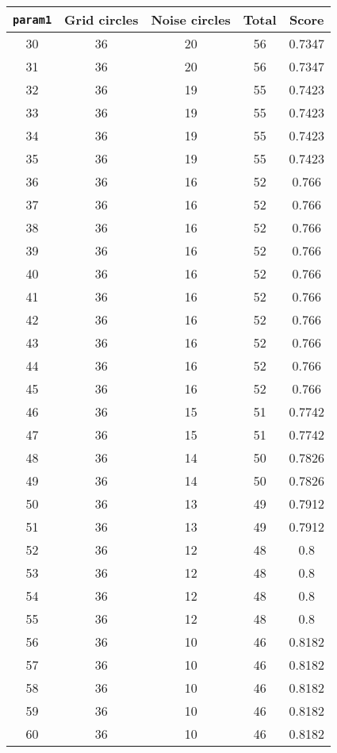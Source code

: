 \documentclass[letterpaper, 12pt]{article}
\begin{document}
\begin{longtable}{|c|c|c|c|c|}
\hline
\textbf{\texttt{param1}} & \textbf{Grid circles} & \textbf{Noise circles} & \textbf{Total} & \textbf{Score} \\
\hline
30 & 36 & 20 & 56 & 0.7347 \\
\hline
31 & 36 & 20 & 56 & 0.7347 \\
\hline
32 & 36 & 19 & 55 & 0.7423 \\
\hline
33 & 36 & 19 & 55 & 0.7423 \\
\hline
34 & 36 & 19 & 55 & 0.7423 \\
\hline
35 & 36 & 19 & 55 & 0.7423 \\
\hline
36 & 36 & 16 & 52 & 0.766 \\
\hline
37 & 36 & 16 & 52 & 0.766 \\
\hline
38 & 36 & 16 & 52 & 0.766 \\
\hline
39 & 36 & 16 & 52 & 0.766 \\
\hline
40 & 36 & 16 & 52 & 0.766 \\
\hline
41 & 36 & 16 & 52 & 0.766 \\
\hline
42 & 36 & 16 & 52 & 0.766 \\
\hline
43 & 36 & 16 & 52 & 0.766 \\
\hline
44 & 36 & 16 & 52 & 0.766 \\
\hline
45 & 36 & 16 & 52 & 0.766 \\
\hline
46 & 36 & 15 & 51 & 0.7742 \\
\hline
47 & 36 & 15 & 51 & 0.7742 \\
\hline
48 & 36 & 14 & 50 & 0.7826 \\
\hline
49 & 36 & 14 & 50 & 0.7826 \\
\hline
50 & 36 & 13 & 49 & 0.7912 \\
\hline
51 & 36 & 13 & 49 & 0.7912 \\
\hline
52 & 36 & 12 & 48 & 0.8 \\
\hline
53 & 36 & 12 & 48 & 0.8 \\
\hline
54 & 36 & 12 & 48 & 0.8 \\
\hline
55 & 36 & 12 & 48 & 0.8 \\
\hline
56 & 36 & 10 & 46 & 0.8182 \\
\hline
57 & 36 & 10 & 46 & 0.8182 \\
\hline
58 & 36 & 10 & 46 & 0.8182 \\
\hline
59 & 36 & 10 & 46 & 0.8182 \\
\hline
60 & 36 & 10 & 46 & 0.8182 \\
\hline

\end{longtable}
\end{document}
